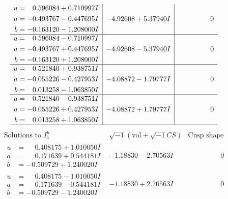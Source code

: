 \documentclass[1p]{elsarticle_modified}
\theoremstyle{definition}
\newcommand{\I}{\sqrt{-1}}
\begin{document}
$$\begin{array}{c|c|c}
\begin{aligned}
u &= \phantom{-}0.596084 + 0.710997 I \\
a &= -0.493767 - 0.447695 I \\
b &= -0.163120 - 1.208000 I\end{aligned}
 & -4.92608 + 5.37940 I & \phantom{-0.000000 } 0 \\ \hline\begin{aligned}
u &= \phantom{-}0.596084 - 0.710997 I \\
a &= -0.493767 + 0.447695 I \\
b &= -0.163120 + 1.208000 I\end{aligned}
 & -4.92608 - 5.37940 I & \phantom{-0.000000 } 0 \\ \hline\begin{aligned}
u &= \phantom{-}0.521840 + 0.938751 I \\
a &= -0.055226 - 0.427953 I \\
b &= \phantom{-}0.013258 - 1.063850 I\end{aligned}
 & -4.08872 - 1.79777 I & \phantom{-0.000000 } 0 \\ \hline\begin{aligned}
u &= \phantom{-}0.521840 - 0.938751 I \\
a &= -0.055226 + 0.427953 I \\
b &= \phantom{-}0.013258 + 1.063850 I\end{aligned}
 & -4.08872 + 1.79777 I & \phantom{-0.000000 } 0\\
 \hline 
 \end{array}$$\newpage$$\begin{array}{c|c|c}  
\text{Solutions to }I^u_{1}& \I (\text{vol} + \sqrt{-1}CS) & \text{Cusp shape}\\
 \hline 
\begin{aligned}
u &= \phantom{-}0.408175 + 1.010050 I \\
a &= \phantom{-}0.171639 + 0.544181 I \\
b &= -0.509729 + 1.240020 I\end{aligned}
 & -1.18830 - 2.70563 I & \phantom{-0.000000 } 0 \\ \hline\begin{aligned}
u &= \phantom{-}0.408175 - 1.010050 I \\
a &= \phantom{-}0.171639 - 0.544181 I \\
b &= -0.509729 - 1.240020 I\end{aligned}
 & -1.18830 + 2.70563 I & \phantom{-0.000000 } 0 \\ \hline\begin{aligned}

\end{aligned}
\end{array}$$
\end{document}
